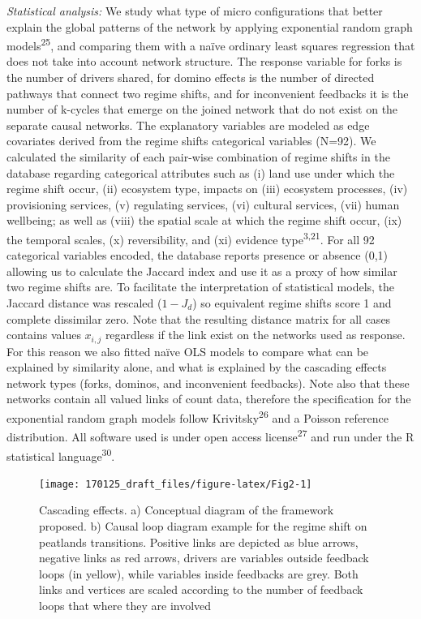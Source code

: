 \documentclass[9pt,]{article}
\begin{document}
\emph{Statistical analysis:} We study what type of micro configurations
that better explain the global patterns of the network by applying
exponential random graph models\textsuperscript{25}, and comparing them
with a naïve ordinary least squares regression that does not take into
account network structure. The response variable for forks is the number
of drivers shared, for domino effects is the number of directed pathways
that connect two regime shifts, and for inconvenient feedbacks it is the
number of k-cycles that emerge on the joined network that do not exist
on the separate causal networks. The explanatory variables are modeled
as edge covariates derived from the regime shifts categorical variables
(N=92). We calculated the similarity of each pair-wise combination of
regime shifts in the database regarding categorical attributes such as
(i) land use under which the regime shift occur, (ii) ecosystem type,
impacts on (iii) ecosystem processes, (iv) provisioning services, (v)
regulating services, (vi) cultural services, (vii) human wellbeing; as
well as (viii) the spatial scale at which the regime shift occur, (ix)
the temporal scales, (x) reversibility, and (xi) evidence
type\textsuperscript{3,21}. For all 92 categorical variables encoded,
the database reports presence or absence (0,1) allowing us to calculate
the Jaccard index and use it as a proxy of how similar two regime shifts
are. To facilitate the interpretation of statistical models, the Jaccard
distance was rescaled (\(1 - J_{d}\)) so equivalent regime shifts score
1 and complete dissimilar zero. Note that the resulting distance matrix
for all cases contains values \(x_{i,j}\) regardless if the link exist
on the networks used as response. For this reason we also fitted naïve
OLS models to compare what can be explained by similarity alone, and
what is explained by the cascading effects network types (forks,
dominos, and inconvenient feedbacks). Note also that these networks
contain all valued links of count data, therefore the specification for
the exponential random graph models follow Krivitsky\textsuperscript{26}
and a Poisson reference distribution. All software used is under open
access license\textsuperscript{27} and run under the R statistical
language\textsuperscript{30}.

\begin{figure}

{\centering \texttt{[image: 170125\_draft\_files/figure-latex/Fig2-1]} 

}

\caption{Cascading effects. a) Conceptual diagram of the framework proposed. b) Causal loop diagram example for the regime shift on peatlands transitions. Positive links are depicted as blue arrows, negative links as red arrows, drivers are variables outside feedback loops (in yellow), while variables inside feedbacks are grey. Both links and vertices are scaled according to the number of feedback loops that where they are involved}\label{fig:Fig2}
\end{figure}
\end{document}
